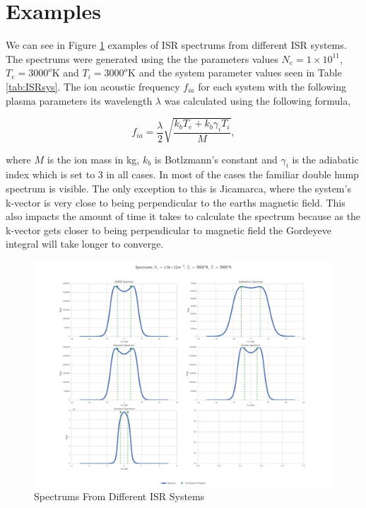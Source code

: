 \section*{Examples}
We can see in Figure \ref{fig:diffspectrums} examples of ISR spectrums from different ISR systems. The spectrums were generated using the the parameters values $N_e=1\times10^{11}$, $T_e=3000^o$K and $T_i=3000^o$K and the system parameter values seen in Table \ref{tab:ISRsys}. The ion acoustic frequency $f_{ia}$ for each system with the following plasma parameters its wavelength $\lambda$ was calculated using the following formula,

\begin{equation}
\label{eq:iaf}
f_{ia} = \frac{\lambda}{2}\sqrt{\frac{k_bT_e +k_b\gamma_iT_i}{M}},
\end{equation}

\noindent where $M$ is the ion mass in kg, $k_b$ is Botlzmann's constant and $\gamma_i$ is the adiabatic index which is set to 3 in all cases. In most of the cases the familiar double hump spectrum is visible. The only exception to this is Jicamarca, where the system's k-vector is very close to being perpendicular to the earths magnetic field. This also impacts the amount of time it takes to calculate the spectrum because as the k-vector gets closer to being perpendicular to magnetic field the Gordeyeve integral will take longer to converge.
\begin{figure}[!h]
\centering
\includegraphics[width=7.0in]{DifferentSystems}

\caption{Spectrums From Different ISR Systems}
\label{fig:diffspectrums}
\end{figure}


